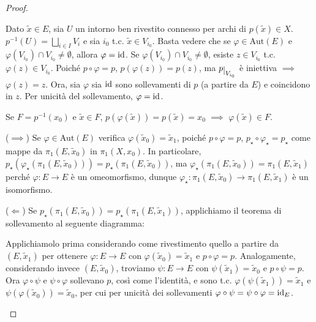 \begin{proof}
  \begin{nlist}
    \item Dato $\tilde{x} \in E$, sia $U$ un intorno ben rivestito connesso per archi di $p(\tilde{x}) \in X$. $\displaystyle p^{-1}(U)=\bigsqcup_{i \in I} V_i$ e sia $i_0$ t.c. $\tilde{x} \in V_{i_0}$.
    Basta vedere che se $\varphi \in \text{Aut}(E)$ e $\varphi(V_{i_0})\cap V_{i_0} \not=\emptyset$, allora $\varphi=\operatorname{id}$. Se $\varphi(V_{i_0})\cap V_{i_0} \not=\emptyset$, esiste $z \in V_{i_0}$ t.c. $\varphi(z) \in V_{i_0}$.
    Poiché $p \circ \varphi=p$, $p(\varphi(z))=p(z)$, ma $p\restrict{V_{i_0}}$ è iniettiva $\implies$ $\varphi(z)=z$. Ora, sia $\varphi$ sia $\operatorname{id}$ sono sollevamenti di $p$ (a partire da $E$) e coincidono in $z$. Per unicità del sollevamento, $\varphi=\operatorname{id}$.
    \item Se $F=p^{-1}(x_0)$ e $\tilde{x} \in F$, $p(\varphi(\tilde{x}))=p(\tilde{x})=x_0$ $\implies$ $\varphi(\tilde{x}) \in F$.
    \item ($\implies$) Se $\varphi \in \text{Aut}(E)$ verifica $\varphi(\tilde{x}_0)=\tilde{x}_1$, poiché $p \circ \varphi=p$, $p_{\star} \circ \varphi_{\star}=p_{\star}$ come mappe da $\pi_1(E, \tilde{x}_0)$ in $\pi_1(X, x_0)$.
    In particolare, $p_{\star}(\varphi_{\star}(\pi_1(E, \tilde{x}_0)))=p_{\star}(\pi_1(E, \tilde{x}_0))$, ma $\varphi_{\star}(\pi_1(E, \tilde{x}_0))=\pi_1(E, \tilde{x}_1)$ perché $\varphi:E \rightarrow E$ è un omeomorfismo, dunque $\varphi_{\star}:\pi_1(E, \tilde{x}_0) \rightarrow \pi_1(E, \tilde{x}_1)$ è un isomorfismo.

    ($\Leftarrow$) Se $p_{\star}(\pi_1(E, \tilde{x}_0))=p_{\star}(\pi_1(E, \tilde{x}_1))$, applichiamo il teorema di sollevamento al seguente diagramma:
    \begin{center}
    \end{center}
    Applichiamolo prima considerando come rivestimento quello a partire da $(E, \tilde{x}_1)$ per ottenere $\varphi:E \rightarrow E$ con $\varphi(\tilde{x}_0)=\tilde{x}_1$ e $p \circ \varphi=p$. Analogamente, considerando invece $(E, \tilde{x}_0)$, troviamo $\psi:E \rightarrow E$ con $\psi(\tilde{x}_1)=\tilde{x}_0$ e $p \circ \psi=p$.
    Ora $\varphi \circ \psi$ e $\psi \circ \varphi$ sollevano $p$, così come l'identità, e sono t.c. $\varphi(\psi(\tilde{x}_1))=\tilde{x}_1$ e $\psi(\varphi(\tilde{x}_0))=\tilde{x}_0$, per cui per unicità dei sollevamenti $\varphi \circ \psi=\psi \circ \varphi=\operatorname{id}_E$.
  \end{nlist}
\end{proof}

